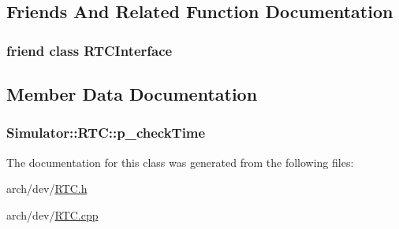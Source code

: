 \subsection{Friends And Related Function Documentation}
\hypertarget{class_simulator_1_1_r_t_c_a58c27960f4b3a3fc2222e6334ed17033}{
\subsubsection[{R\+T\+C\+Interface}]{\setlength{\rightskip}{0pt plus 5cm}friend class R\+T\+C\+Interface\hspace{0.3cm}{\ttfamily [friend]}}}\label{class_simulator_1_1_r_t_c_a58c27960f4b3a3fc2222e6334ed17033}


\subsection{Member Data Documentation}
\hypertarget{class_simulator_1_1_r_t_c_a2b4414816760ec2e6a2d1a0af89861c8}{
\subsubsection[{p\+\_\+check\+Time}]{ Simulator\+::\+R\+T\+C\+::p\+\_\+check\+Time}}\label{class_simulator_1_1_r_t_c_a2b4414816760ec2e6a2d1a0af89861c8}


The documentation for this class was generated from the following files\+:\begin{DoxyCompactItemize}
\item 
arch/dev/\hyperlink{_r_t_c_8h}{R\+T\+C.\+h}\item 
arch/dev/\hyperlink{_r_t_c_8cpp}{R\+T\+C.\+cpp}\end{DoxyCompactItemize}
